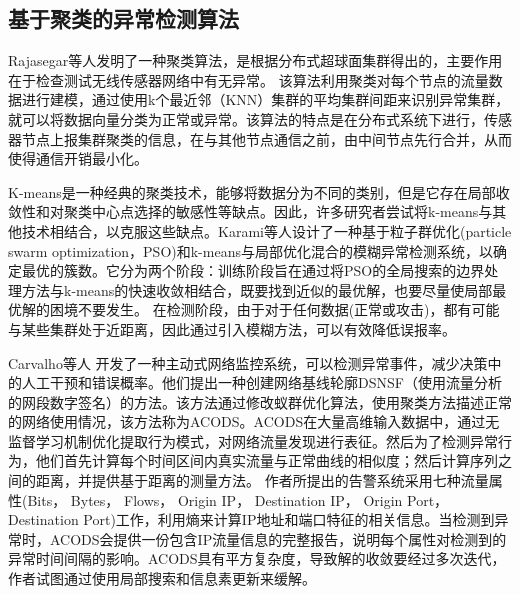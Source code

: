 \subsection{基于聚类的异常检测算法}



Rajasegar等人\cite{2014Hyperspherical}发明了一种聚类算法，是根据分布式超球面集群得出的，主要作用在于检查测试无线传感器网络中有无异常。
该算法利用聚类对每个节点的流量数据进行建模，通过使用k个最近邻（KNN）集群的平均集群间距来识别异常集群，就可以将数据向量分类为正常或异常。该算法的特点是在分布式系统下进行，传感器节点上报集群聚类的信息，在与其他节点通信之前，由中间节点先行合并，从而使得通信开销最小化。


K-means是一种经典的聚类技术，能够将数据分为不同的类别，但是它存在局部收敛性和对聚类中心点选择的敏感性等缺点。因此，许多研究者尝试将k-means与其他技术相结合，以克服这些缺点。Karami等人\cite{2015Karami}设计了一种基于粒子群优化(particle swarm optimization，PSO)和k-means与局部优化混合的模糊异常检测系统，以确定最优的簇数。它分为两个阶段：训练阶段旨在通过将PSO的全局搜索的边界处理方法与k-means的快速收敛相结合，既要找到近似的最优解，也要尽量使局部最优解的困境不要发生。
在检测阶段，由于对于任何数据(正常或攻击)，都有可能与某些集群处于近距离，因此通过引入模糊方法，可以有效降低误报率。



Carvalho等人\cite{carvalho2016unsupervised} 开发了一种主动式网络监控系统，可以检测异常事件，减少决策中的人工干预和错误概率。他们提出一种创建网络基线轮廓DSNSF（使用流量分析的网段数字签名）的方法。该方法通过修改蚁群优化算法，使用聚类方法描述正常的网络使用情况，该方法称为ACODS。ACODS在大量高维输入数据中，通过无监督学习机制优化提取行为模式，对网络流量发现进行表征。然后为了检测异常行为，他们首先计算每个时间区间内真实流量与正常曲线的相似度；然后计算序列之间的距离，并提供基于距离的测量方法。
作者所提出的告警系统采用七种流量属性(Bits， Bytes， Flows， Origin IP， Destination IP， Origin Port， Destination Port)工作，利用熵来计算IP地址和端口特征的相关信息。当检测到异常时，ACODS会提供一份包含IP流量信息的完整报告，说明每个属性对检测到的异常时间间隔的影响。ACODS具有平方复杂度，导致解的收敛要经过多次迭代，作者试图通过使用局部搜索和信息素更新来缓解。

